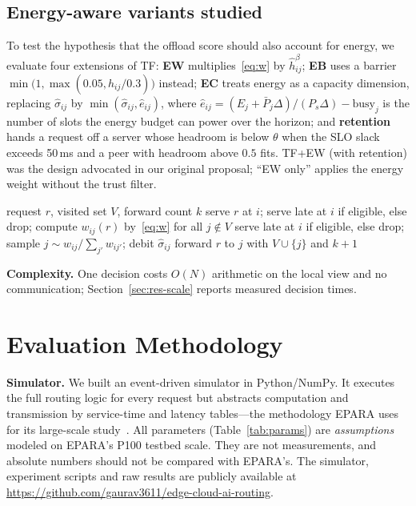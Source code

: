 \documentclass[journal]{IEEEtran}
\newcommand{\sys}{\textsc{Trace}}
\begin{document}
\subsection{Energy-aware variants studied}
To test the hypothesis that the offload score should also account for energy, we evaluate four extensions of TF:
\textbf{EW} multiplies~\eqref{eq:w} by $\hat h_{ij}^{\beta}$;
\textbf{EB} uses a barrier $\min\!\big(1,\max(0.05,\hat h_{ij}/0.3)\big)$ instead;
\textbf{EC} treats energy as a capacity dimension, replacing $\hat\sigma_{ij}$ by $\min(\hat\sigma_{ij},\hat e_{ij})$, where $\hat e_{ij}=(E_j+\bar P_j\Delta)/(P_s\Delta)-\text{busy}_j$ is the number of slots the energy budget can power over the horizon; and
\textbf{retention} hands a request off a server whose headroom is below $\theta$ when the SLO slack exceeds 50\,ms and a peer with headroom above $0.5$ fits.
TF+EW (with retention) was the design advocated in our original proposal; ``EW only'' applies the energy weight without the trust filter.

\begin{algorithm}[t]
\caption{\sys{} request handling at server $i$}\label{alg:route}
\begin{algorithmic}[1]
\Require request $r$, visited set $V$, forward count $k$
  \State serve $r$ at $i$; \Return
\EndIf
{} \State serve late at $i$ if eligible, else drop; \Return \EndIf
\State compute $w_{ij}(r)$ by~\eqref{eq:w} for all $j\notin V$
 \State serve late at $i$ if eligible, else drop; \Return \EndIf
\State sample $j\sim w_{ij}/\sum_{j'}w_{ij'}$; debit $\hat\sigma_{ij}$
\State forward $r$ to $j$ with $V\cup\{j\}$ and $k+1$
\end{algorithmic}
\end{algorithm}

\textbf{Complexity.} One decision costs $O(N)$ arithmetic on the local view and no communication; Section~\ref{sec:res-scale} reports measured decision times.

\section{Evaluation Methodology}\label{sec:method}

\textbf{Simulator.} We built an event-driven simulator in Python/NumPy. It executes the full routing logic for every request but abstracts computation and transmission by service-time and latency tables---the methodology EPARA uses for its large-scale study~\cite{epara2025}. All parameters (Table~\ref{tab:params}) are \emph{assumptions} modeled on EPARA's P100 testbed scale. They are not measurements, and absolute numbers should not be compared with EPARA's. The simulator, experiment scripts and raw results are publicly available at \url{https://github.com/gaurav3611/edge-cloud-ai-routing}.
\end{document}
